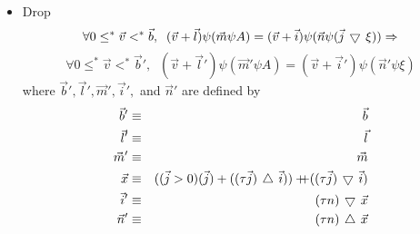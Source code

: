 \begin{itemize}
\item{Drop}
$$\forall 0\leq^{*}\vec{v}<^{*}\vec{b}, \;\;(\vec{v}+\vec{l})\psi(\vec{m}\psi 
	A)=(\vec{v}+\vec{i})\psi(\vec{n}\psi(\vec{j}\,\bigtriangledown\,\xi))\Rightarrow$$
$$\forall 0\leq^{*}\vec{v}<^{*}\vec{b}', \;\;(\vec{v}+\vec{l}')\psi(\vec{m}'
	\psi A)=(\vec{v}+\vec{i}')\psi(\vec{n}'\psi\xi)$$
where $\vec{b}', \vec{l}', \vec{m}', \vec{i}',$ and $\vec{n}'$ are defined by
\begin{eqnarray*}
\vec{b}' & \equiv & \vec{b} \\
\vec{l}' & \equiv & \vec{l} \\
\vec{m}' & \equiv & \vec{m} \\
\vec{x} & \equiv & ((\vec{j}>0)(\vec{j})+((\tau\vec{j})\,\bigtriangleup\,\vec{i}))+\!\!\!\!+
	((\tau\vec{j})\,\bigtriangledown\,\vec{i}) \\
\vec{i}' & \equiv & (\tau n)\,\bigtriangledown\,\vec{x} \\
\vec{n}' & \equiv & (\tau n)\,\bigtriangleup\,\vec{x}
\end{eqnarray*}
 

\end{itemize}
